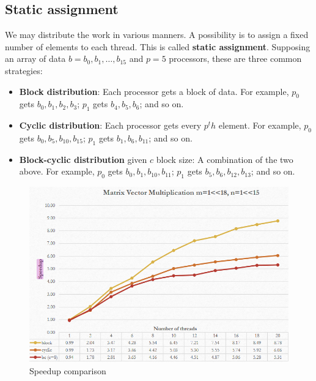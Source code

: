 \subsection{Static assignment}
We may distribute the work in various manners.
A possibility is to assign a fixed number of elements to each thread. This is called \textbf{static assignment}.
Supposing an array of data $b = {b_0, b_1, \ldots, b_15}$ and $p=5$ processors, these are three common strategies:
\begin{paracol}{2}
   \begin{itemize}
      \item \textbf{Block distribution}: Each processor gets a block of data. For example, $p_0$ gets $b_0, b_1, b_2, b_3$; $p_1$ gets $b_4, b_5, b_6$; and so on.
      \item \textbf{Cyclic distribution}: Each processor gets every $p^th$ element. For example, $p_0$ gets $b_0, b_5, b_{10}, b_{15}$; $p_1$ gets $b_1, b_6, b_{11}$; and so on.
      \item \textbf{Block-cyclic distribution} given $c$ block size: A combination of the two above. For example, $p_0$ gets $b_0, b_1, b_{10}, b_{11}$; $p_1$ gets $b_5, b_6, b_{12}, b_{13}$; and so on.
   \end{itemize}

\switchcolumn

\begin{figure}[htbp]
   \centering
   \includegraphics{images/08/speedup}
   \caption{Speedup comparison}
   \label{fig:08/speedup}
\end{figure}

\end{paracol}

